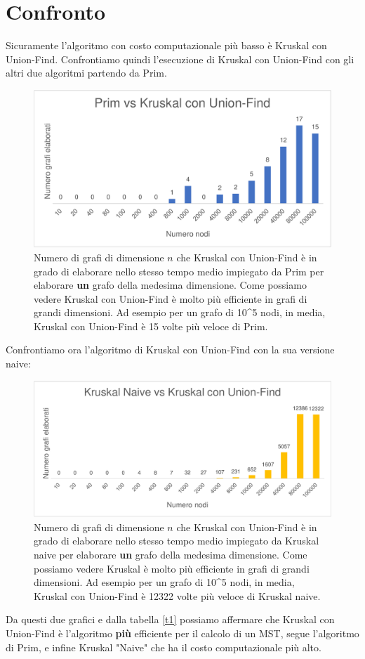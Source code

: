 \section{Confronto}
Sicuramente l'algoritmo con costo computazionale più basso è Kruskal con Union-Find.
Confrontiamo quindi l'esecuzione di Kruskal con Union-Find con gli altri due algoritmi partendo da Prim. 
\begin{figure}[H]
\centering
\includegraphics[scale=0.5]{grafici/primvskruskaluf.pdf}
\caption{Numero di grafi di dimensione $n$ che Kruskal con Union-Find è in grado di elaborare nello stesso tempo medio impiegato da Prim per elaborare \textbf{un} grafo  della medesima dimensione. Come possiamo vedere Kruskal con Union-Find è molto più efficiente in grafi di grandi dimensioni. Ad esempio per un grafo di 10\^{}5 nodi, in media, Kruskal con Union-Find è 15 volte più veloce di Prim.
}
\end{figure}
Confrontiamo ora l'algoritmo di Kruskal con Union-Find con la sua versione naive:
\begin{figure}[H]
\centering
\includegraphics[scale=0.5]{grafici/kruskalvskruskaluf.pdf}
\caption{Numero di grafi di dimensione $n$ che Kruskal con Union-Find è in grado di elaborare nello stesso tempo medio impiegato da Kruskal naive per elaborare \textbf{un} grafo della medesima dimensione. Come possiamo vedere Kruskal è molto più efficiente in grafi di grandi dimensioni. Ad esempio per un grafo di 10\^{}5 nodi, in media, Kruskal con Union-Find è 12322 volte più veloce di Kruskal naive.}
\end{figure}
Da questi due grafici e dalla tabella \ref{t1} possiamo affermare che Kruskal con Union-Find è l'algoritmo \textbf{più} efficiente per il calcolo di un MST, segue l'algoritmo di Prim, e infine Kruskal "Naive" che ha il costo computazionale più alto.
